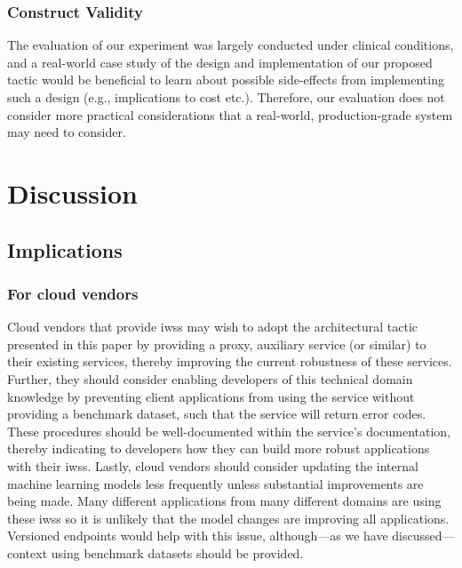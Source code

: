 \subsubsection{Construct Validity}
The evaluation of our experiment was largely conducted under clinical conditions, and a real-world case study of the design and implementation of our proposed tactic would be beneficial to learn about possible side-effects from implementing such a design (e.g., implications to cost etc.). Therefore, our evaluation does not consider more practical considerations that a real-world, production-grade system may need to consider.


\section{Discussion}
\label{fse2020:sec:discussion}


\subsection{Implications}

\subsubsection{For cloud vendors} Cloud vendors that provide \glspl{iws} may wish to adopt the architectural tactic presented in this paper by providing a proxy, auxiliary service (or similar) to their existing services, thereby improving the current robustness of these services. Further, they should consider enabling developers of this technical domain knowledge by preventing client applications from using the service without providing a benchmark dataset, such that the service will return  error codes.
These procedures should be well-documented within the service's  documentation, thereby indicating to developers how they can build more robust applications with their \glspl{iws}.
Lastly, cloud vendors should consider updating the internal machine learning models less frequently unless substantial improvements are being made. Many different applications from many different domains are using these \glspl{iws} so it is unlikely that the model changes are improving all applications. Versioned endpoints would help with this issue, although---as we have discussed---context using benchmark datasets should be provided.

